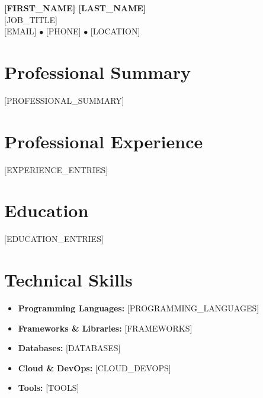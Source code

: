 \documentclass[11pt,a4paper]{article}
\newcommand{\cvheader}[6]{
    \begin{center}
        {\Huge\bfseries\color{primarycolor}#1 #2}\\[0.3cm]
        {\large\color{secondarycolor}#3}\\[0.2cm]
        #4 $\bullet$ #5 $\bullet$ #6
    \end{center}
    \vspace{0.3cm}
}
\newcommand{\cventry}[6]{
    \textbf{#1} \hfill {\color{secondarycolor}#2}\\
    \textit{#3} \hfill {\color{secondarycolor}#4}\\
    #5
    \vspace{0.2cm}
}
\begin{document}
\cvheader{[FIRST_NAME]}{[LAST_NAME]}{[JOB_TITLE]}{[EMAIL]}{[PHONE]}{[LOCATION]}

\section{Professional Summary}
[PROFESSIONAL_SUMMARY]

\section{Professional Experience}
[EXPERIENCE_ENTRIES]

\section{Education}
[EDUCATION_ENTRIES]

\section{Technical Skills}
\begin{itemize}[leftmargin=*,noitemsep]
    \item \textbf{Programming Languages:} [PROGRAMMING_LANGUAGES]
    \item \textbf{Frameworks \& Libraries:} [FRAMEWORKS]
    \item \textbf{Databases:} [DATABASES]
    \item \textbf{Cloud \& DevOps:} [CLOUD_DEVOPS]
    \item \textbf{Tools:} [TOOLS]
\end{itemize}
\end{document}
